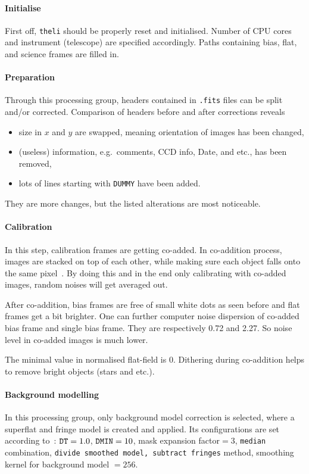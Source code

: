 \paragraph{Initialise}  First off, \verb|theli| should be properly reset and initialised. Number of CPU cores and instrument (telescope) are specified accordingly. Paths containing bias, flat, and science frames are filled in.

\paragraph{Preparation}
Through this processing group, headers contained in \verb|.fits| files can be split and/or corrected. Comparison of headers before and after corrections reveals
\begin{itemize}
   \item size in $x$ and $y$ are swapped, meaning orientation of images has been changed,
   \item (useless) information, e.g.~comments, CCD info, Date, and etc., has been removed,
   \item lots of lines starting with \verb|DUMMY| have been added.
\end{itemize}
They are more changes, but the listed alterations are most noticeable.

\paragraph{Calibration}
In this step, calibration frames are getting co-added. In co-addition process, images are stacked on top of each other, while making sure each object falls onto the same pixel~\cite{manual}. By doing this and in the end only calibrating with co-added images, random noises will get averaged out.  

After co-addition, bias frames are free of small white dots as seen before and flat frames get a bit brighter. One can further computer noise dispersion of co-added bias frame and single bias frame. They are respectively \num{0.72} and \num{2.27}. So noise level in co-added images is much lower.

The minimal value in normalised flat-field is $0$. Dithering during co-addition helps to remove bright objects (stars and etc.).

\paragraph{Background modelling}
In this processing group, only background model correction is selected, where a superflat and fringe model is created and applied. Its configurations are set according to~\cite{manual}: $\verb|DT| = 1.0$, $\verb|DMIN|=10$, mask expansion factor$=3$, \verb|median| combination, \verb|divide smoothed model, subtract fringes| method, smoothing kernel for background model $=256$.

